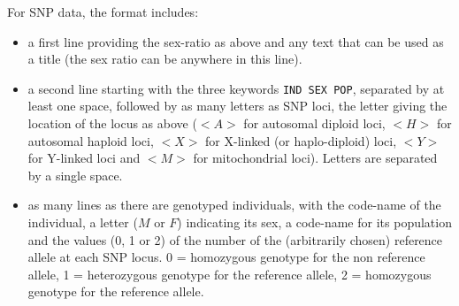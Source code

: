 For SNP data, the format includes:
\begin{itemize}
 \item a first line providing the sex-ratio as above and any text that can be used as a title (the sex ratio can be anywhere in this line).
 \item a second line starting with the three keywords \texttt{IND  SEX  POP}, separated by at least one space, followed by as many letters as SNP loci, the letter giving the location of the locus as above ($<A>$ for autosomal diploid loci, $<H>$ for autosomal haploid loci, $<X>$ for X-linked (or haplo-diploid) loci, $<Y>$ for Y-linked loci and $<M>$ for mitochondrial loci). Letters are separated by a single space.
 \item as many lines as there are genotyped individuals, with the code-name of the individual, a letter ($M$ or $F$) indicating its sex, a code-name for its population and the values (0, 1 or 2) of the number of the (arbitrarily chosen) reference allele at each SNP locus. 0 = homozygous genotype for the non reference allele, 1 = heterozygous genotype for the reference allele, 2 = homozygous genotype for the reference allele.
\end{itemize}


